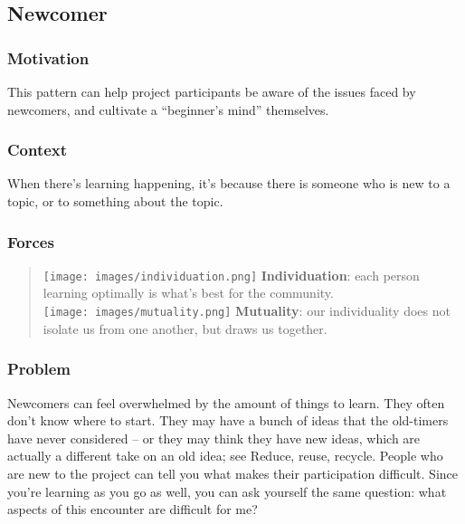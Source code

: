 \hypertarget{newcomer}{%
\subsection{Newcomer}\label{newcomer}}

\hypertarget{motivation}{%
\subsubsection{Motivation}\label{motivation}}

This pattern can help project participants be aware of the issues faced
by newcomers, and cultivate a ``beginner's mind'' themselves.

\hypertarget{context}{%
\subsubsection{Context}\label{context}}

When there's learning happening, it's because there is someone who is
new to a topic, or to something about the topic.

\hypertarget{forces}{%
\subsubsection{Forces}\label{forces}}

\begin{quote}
\texttt{[image: images/individuation.png]} \textbf{Individuation}: each
person learning optimally is what's best for the community.\\
\texttt{[image: images/mutuality.png]} \textbf{Mutuality}: our
individuality does not isolate us from one another, but draws us
together.
\end{quote}

\hypertarget{problem}{%
\subsubsection{Problem}\label{problem}}

Newcomers can feel overwhelmed by the amount of things to learn. They
often don't know where to start. They may have a bunch of ideas that the
old-timers have never considered -- or they may think they have new
ideas, which are actually a different take on an old idea; see {{Reduce,
reuse, recycle}}. People who are new to the project can tell you what
makes their participation difficult. Since you're learning as you go as
well, you can ask yourself the same question: what aspects of this
encounter are difficult for me?

